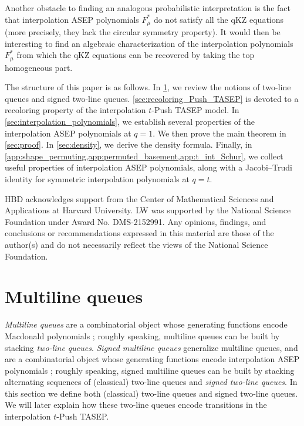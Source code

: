 \documentclass[12pt]{amsart}
\theoremstyle{definition}
\begin{document}
Another obstacle to finding an analogous probabilistic interpretation is the fact that interpolation ASEP polynomials $F_\mu^*$ do not satisfy all the qKZ equations (more precisely, they lack the circular symmetry property). It would then be interesting to find an algebraic characterization of the interpolation polynomials $F_\mu^*$ from which the qKZ equations can be recovered by taking the top homogeneous part.


\medskip 

The structure of this paper is as follows. In \cref{sec:MLQ}, we review the notions of  two-line queues and signed two-line queues. \cref{sec:recoloring_Push_TASEP} is devoted to a recoloring property of the interpolation $t$-Push TASEP model. In \cref{sec:interpolation_polynomials}, we establish several properties of the interpolation ASEP polynomials at $q=1$.  We then prove the main theorem in \cref{sec:proof}. In \cref{sec:density}, we derive the density formula. Finally, in \cref{app:shape_permuting,app:permuted_basement,app:t_int_Schur}, we collect useful properties of interpolation ASEP polynomials, along with a Jacobi--Trudi identity for symmetric interpolation polynomials at $q=t$.



\bigskip
{}
HBD acknowledges support from the Center of Mathematical Sciences and Applications at Harvard University.
LW was supported by the National Science Foundation under Award No.
DMS-2152991.
Any opinions, findings, and conclusions or recommendations expressed in this material are
those of the author(s) and do not necessarily reflect the views of the National Science
Foundation.  


\section{Multiline queues}\label{sec:MLQ}

\emph{Multiline queues} are a combinatorial object whose generating functions
encode Macdonald polynomials \cite{CorteelMandelshtamWilliams2022}; roughly speaking, multiline queues can be built by stacking \emph{two-line queues}.
\emph{Signed multiline queues}
generalize multiline queues, and are a combinatorial object whose generating functions encode interpolation ASEP polynomials \cite{BenDaliWilliams2025}; roughly speaking, signed multiline queues 
can be built by stacking alternating sequences of (classical) two-line queues and \emph{signed two-line queues}.  
In this section we define both 
(classical) two-line queues and signed two-line queues.  We will later explain how these two-line queues encode transitions in the 
interpolation $t$-Push TASEP.
\end{document}
